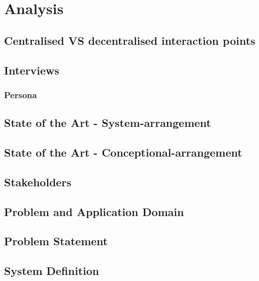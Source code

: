 \chapter{Analysis}


\section{Centralised VS decentralised interaction points}


\section{Interviews}





\subsection{Persona}


\section{State of the Art - System-arrangement}

\section{State of the Art - Conceptional-arrangement}


\section{Stakeholders}


\section{Problem and Application Domain}


\section{Problem Statement}


\section{System Definition}

